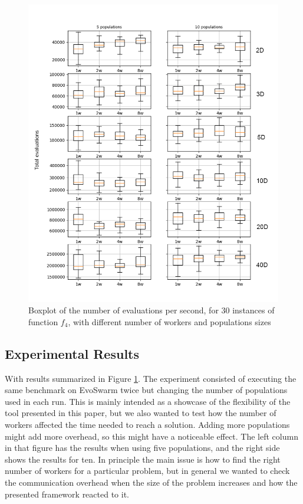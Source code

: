 \documentclass[review]{elsarticle}
\begin{document}
%
%
%
\begin{figure}[h!tbp]
  \centering
  \includegraphics[width=\textwidth]{evalsworker}
  \caption{Boxplot of the number of evaluations per second, for 30 instances of function $f_4$, with different number of workers and populations sizes }
   
  \label{fig:spworker}
\end{figure}


\subsection{Experimental Results} 
\label{results}

With results summarized in Figure \ref{fig:spworker}.  The
experiment consisted of executing the same benchmark on EvoSwarm twice but
changing the number of populations used in each run. This is mainly
intended as a showcase of the flexibility of the tool presented in
this paper, but we also wanted to test how the number of workers
affected the time needed to reach a solution. Adding more populations
might add more overhead, so this might have a noticeable effect.
The left column in that figure has the
results when using five populations, and the right side shows the results for
ten. In principle the main issue is how to find the right number of
workers for a particular problem, but in general we wanted to check
the communication overhead when the size of the problem increases and
how the presented framework reacted to it. %
\end{document}

